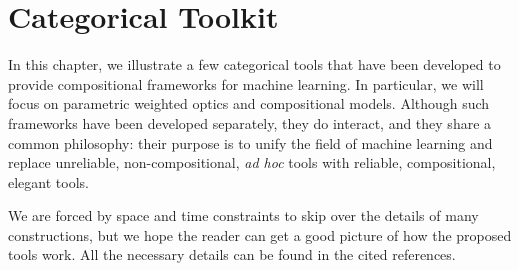 \documentclass[12pt,a4paper,openright,twoside]{report}
\theoremstyle{plain}
\theoremstyle{definition}
\begin{document}
\tableofcontents
\rhead[\fancyplain{}{\bfseries\leftmark}]{\fancyplain{}{\bfseries\thepage}} 
\clearpage{\pagestyle{empty}\cleardoublepage}
































































\chapter{Categorical Toolkit}
\lhead[\fancyplain{}{\bfseries\thepage}]{\fancyplain{}{\bfseries\rightmark}}

In this chapter, we illustrate a few categorical tools that have been developed to provide compositional frameworks for machine learning. In particular, we will focus on parametric weighted optics and compositional models. Although such frameworks have been developed separately, they do interact, and they share a common philosophy: their purpose is to unify the field of machine learning and replace unreliable, non-compositional, \textit{ad hoc} tools with reliable, compositional, elegant tools.


We are forced by space and time constraints to skip over the details of many constructions, but we hope the reader can get a good picture of how the proposed tools work. All the necessary details can be found in the cited references.
\end{document}
